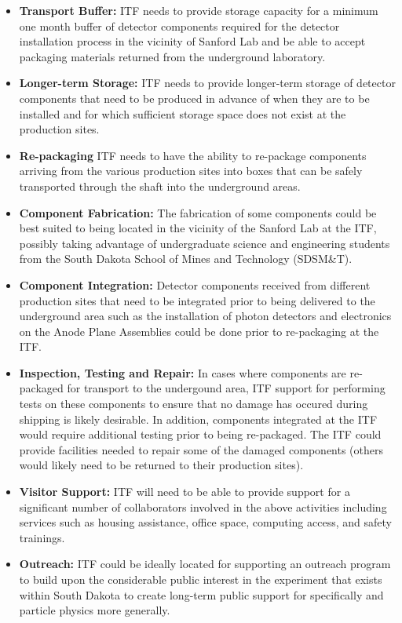 \begin{itemize}
\item {\bf Transport Buffer:} ITF needs to provide storage capacity
  for a minimum one month buffer of detector components required for
  the detector installation process in the vicinity of Sanford Lab and
  be able to accept packaging materials returned from the underground
  laboratory.
\item {\bf Longer-term Storage:}  ITF needs to provide longer-term
  storage of detector components that need to be produced in advance
  of when they are to be installed and for which sufficient storage
  space does not exist at the production sites.
\item {\bf Re-packaging} ITF needs to have the ability to re-package
  components arriving from the various production sites into boxes that
  can be safely transported through the shaft into the underground areas.
\item {\bf Component Fabrication:} The fabrication of some components
  could be best suited to being located in the vicinity of the Sanford
  Lab at the ITF, possibly taking advantage of undergraduate science
  and engineering students from the South Dakota School of Mines and
  Technology (SDSM\&T).
\item {\bf Component Integration:} Detector components received from
  different production sites that need to be integrated prior to being
  delivered to the underground area such as the installation of photon
  detectors and electronics on the Anode Plane Assemblies could be done
  prior to re-packaging at the ITF.
\item {\bf Inspection, Testing and Repair:} In cases where components
  are re-packaged for transport to the undergound area, ITF support
  for performing tests on these components to ensure that no damage has
  occured during shipping is likely desirable.  In addition, components
  integrated at the ITF would require additional testing prior to being
  re-packaged.  The ITF could provide facilities needed to repair some
  of the damaged components (others would likely need to be returned to
  their production sites).
\item {\bf Visitor Support:} ITF will need to be able to provide support
  for a significant number of  collaborators involved in the
  above activities including services such as housing assistance, office
  space, computing access, and safety trainings.
\item {\bf Outreach:} ITF could be ideally located for supporting an
  outreach program to build upon the considerable public interest in
  the experiment that exists within South Dakota to create long-term
  public support for  specifically and particle physics
  more generally.
\end{itemize}

